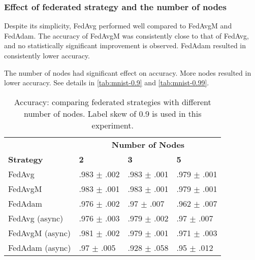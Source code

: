 \documentclass[twocolumn, switch]{article} %
\begin{document}
\subsubsection{Effect of federated strategy and the number of nodes}

Despite its simplicity, FedAvg performed well compared to FedAvgM and FedAdam. The accuracy of FedAvgM was consistently close to that of FedAvg, and no statistically significant improvement is observed. FedAdam resulted in consistently lower accuracy.

The number of nodes had significant effect on accuracy. More nodes resulted in lower accuracy. See details in \autoref{tab:mnist-0.9} and \autoref{tab:mnist-0.99}.

\begin{table}[ht]
    \centering
    \begin{tabular}{l|lll}
    \toprule
    & \multicolumn{3}{c}{\textbf{Number of Nodes}} \\
    \textbf{Strategy} & \textbf{2} & \textbf{3} & \textbf{5}  \\
    \midrule
    
    FedAvg & .983 $\pm$ .002 & .983 $\pm$ .001 & .979 $\pm$ .001 \\
    FedAvgM & .983 $\pm$ .001 & .983 $\pm$ .001 & .979 $\pm$ .001 \\
    FedAdam & .976 $\pm$ .002 & .97 $\pm$ .007 & .962 $\pm$ .007 \\
    \midrule

    FedAvg (async) & .976 $\pm$ .003 & .979 $\pm$ .002 & .97 $\pm$ .007 \\
    FedAvgM (async) & .981 $\pm$ .002 & .979 $\pm$ .001 & .971 $\pm$ .003 \\
    FedAdam (async) & .97 $\pm$ .005 & .928 $\pm$ .058 & .95 $\pm$ .012 \\
    
    \bottomrule
    \end{tabular}
    \vspace{5pt}
    \caption{Accuracy: comparing federated strategies with different number of nodes. Label skew of 0.9 is used in this experiment.}
    \label{tab:mnist-0.9}
    \end{table}
\end{document}
